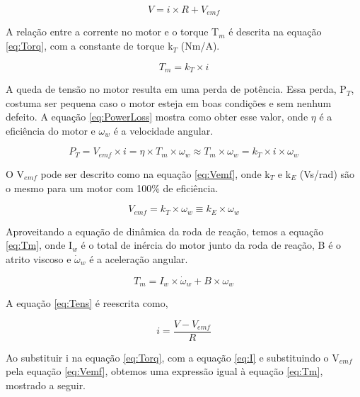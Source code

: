 \documentclass[
	12pt,				%
	openany,			%
	twoside,			%
	a4paper,			%
	english,			%
	french,				%
	spanish,			%
	brazil,				%
	oldfontcommands
	]{abntex2}
\begin{document}
\begin{equation}
V = i \times R + V_{emf}
\label{eq:Tens}
\end{equation}

A relação entre a corrente no motor e o torque T$_{m}$ é descrita na equação \ref{eq:Torq}, com a constante de torque k$_{T}$ (Nm/A).

\begin{equation}
T_{m} = k_{T} \times i
\label{eq:Torq}
\end{equation}

A queda de tensão no motor resulta em uma perda de potência. Essa perda, P$_{T}$, costuma ser pequena caso o motor esteja em boas condições e sem nenhum defeito. A equação \ref{eq:PowerLoss} mostra como obter esse valor, onde $\eta$ é a eficiência do motor e $\omega_{w}$ é a velocidade angular.

\begin{equation}
P_{T} = V_{emf} \times i = \eta \times T_{m} \times \omega_{w} \approx T_{m} \times \omega_{w} = k_{T} \times i \times \omega_{w}
\label{eq:PowerLoss}
\end{equation}

O V$_{emf}$ pode ser descrito como na equação \ref{eq:Vemf}, onde k$_{T}$ e k$_{E}$ (Vs/rad) são o mesmo para um motor com 100\% de eficiência.

\begin{equation}
V_{emf} = k_{T} \times \omega_{w} \equiv k_{E} \times \omega_{w}
\label{eq:Vemf}
\end{equation}

Aproveitando a equação de dinâmica da roda de reação, temos a equação \ref{eq:Tm}, onde I$_{w}$ é o total de inércia do motor junto da roda de reação, B é o atrito viscoso e $\dot{\omega}_{w}$ é a aceleração angular.

\begin{equation}
T_{m} = I_{w} \times \dot{\omega}_{w} + B \times \omega_{w}
\label{eq:Tm}
\end{equation}

A equação \ref{eq:Tens} é reescrita como,

\begin{equation}
i = \frac{V - V_{emf}}{R}
\label{eq:I}
\end{equation}

Ao substituir i na equação \ref{eq:Torq}, com a equação \ref{eq:I} e substituindo o V$_{emf}$ pela equação \ref{eq:Vemf}, obtemos uma expressão igual à equação \ref{eq:Tm}, mostrado a seguir.
\end{document}
